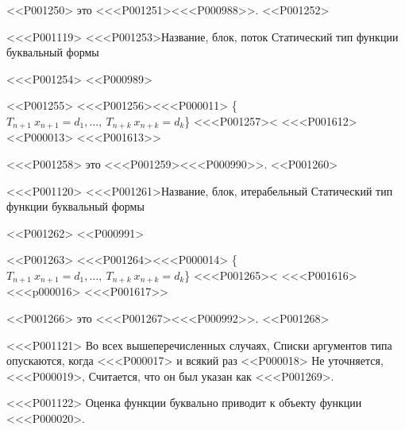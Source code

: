 <<P001250>
это
<<<P001251><<<P000988>>.
<<P001252>

<<<P001119>%
<<<P001253>{Название, блок, поток}
Статический тип функции буквальный формы

<<<P001254>
<<P000989>

<<P001255>
<<<P001256><<<P000011> \{$T_{n+1}\ x_{n+1} = d_1, \ldots,\ T_{n+k}\ x_{n+k} = d_k$\} <<<P001257>< <<<P001612> <<P000013> <<<P001613>>

<<<P001258>
это
<<<P001259><<<P000990>>.
<<P001260>

<<<P001120>%
<<<P001261>{Название, блок, итерабельный}
Статический тип функции буквальный формы

<<P001262>
<<P000991>

<<P001263>
<<<P001264><<<P000014> \{$T_{n+1}\ x_{n+1} = d_1, \ldots,\ T_{n+k}\ x_{n+k} = d_k$\} <<<P001265>< <<<P001616> <<<p000016> <<<P001617>>

<<P001266>
это
<<<P001267><<<P000992>>.
<<P001268>

<<<P001121>%
Во всех вышеперечисленных случаях,
Списки аргументов типа опускаются, когда <<<P000017>
и всякий раз <<P000018> Не уточняется, <<<P000019>,
Считается, что он был указан как <<<P001269>.

<<<P001122>%
Оценка функции буквально приводит к объекту функции <<<P000020>.


